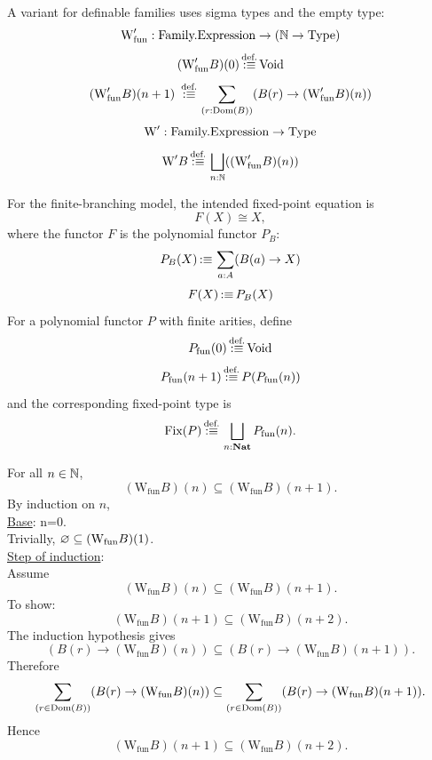 A variant for definable families uses %
sigma types and the empty type:
\[
\mbox{W}_{\mathrm{fun}}':\text{Family.Expression}
\to
(
\mathbb{N}
\to
\mathrm{Type}
)
\]
\[
(\mbox{W}_{\mathrm{fun}}'B)(0)\,{\stackrel{{\textrm{def.}}}{:\equiv}}\, \mathrm{Void}
\]
\[
(\mbox{W}_{\mathrm{fun}}'B)(n+1)\ \,{\stackrel{{\textrm{def.}}}{:\equiv}}\,
\sum_{(r: \mathrm{Dom}(B))} (B(r)\to (\mbox{W}_{\mathrm{fun}}'B)(n) )
\]
\[
\mbox{W}':\text{Family.Expression}\to\mathrm{Type}
\]
\[
\mbox{W}'B\,{\stackrel{{\textrm{def.}}}{:\equiv}}\,\bigsqcup_{n:\mathbb{N}} ((\mbox{W}_{\mathrm{fun}}'B)(n))
\]

For the finite-branching model, the intended fixed-point equation is
\[
F(X)\cong X,
\]
where the functor $F$ is the polynomial functor $P_B$:
\[
P_B(X)
\,{:\equiv}\,
\sum_{a:A}
(B(a)
\to
X)
\]
\[
F(X)\,{:\equiv}\, P_B(X)
\]
For a polynomial functor $P$ with finite arities, define
\[
P_{\text{fun}}(0)\,{\stackrel{{\textrm{def.}}}{:\equiv}}\, \text{Void}
\]
\[
P_{\text{fun}}(n+1)\,{\stackrel{{\textrm{def.}}}{:\equiv}}\, P(P_{\text{fun}}(n))
\]
and the corresponding fixed-point type is
\[
\text{Fix}(P) \,{\stackrel{{\textrm{def.}}}{:\equiv}}\, \bigsqcup_{n:\textbf{Nat}} P_{\text{fun}}(n).
\]

\begin{lemma}
For all $n\in\mathbb{N}$,
\[
(\mbox{W}_{\mathrm{fun}}B)(n)
\subseteq
(\mbox{W}_{\mathrm{fun}}B)(n+1).
\]
\Proof
By induction on $n$,\\
\underline{Base}: n=0.\\
 Trivially, $\varnothing \subseteq (\mbox{W}_{\mathrm{fun}}B)(1)$.\\
\underline{Step of induction}:\\
Assume \[
(\mbox{W}_{\mathrm{fun}}B)(n)
\subseteq
(\mbox{W}_{\mathrm{fun}}B)(n+1).
\]
To show:
\[
(\mbox{W}_{\mathrm{fun}}B)(n+1)
\subseteq
(\mbox{W}_{\mathrm{fun}}B)(n+2).
\]
The induction hypothesis gives
\[
(B(r)\to(\mbox{W}_{\mathrm{fun}}B)(n))
\subseteq
(B(r)\to(\mbox{W}_{\mathrm{fun}}B)(n+1)).
\]
Therefore
\[
\sum_{(r\in \mathrm{Dom}(B))} (B(r)\to(\mbox{W}_{\mathrm{fun}}B)(n))
\subseteq
\sum_{(r\in \mathrm{Dom}(B))} (B(r)\to(\mbox{W}_{\mathrm{fun}}B)(n+1)).
\]
Hence
\[
(\mbox{W}_{\mathrm{fun}}B)(n+1)
\subseteq
(\mbox{W}_{\mathrm{fun}}B)(n+2).
\]
\Done
\end{lemma}




